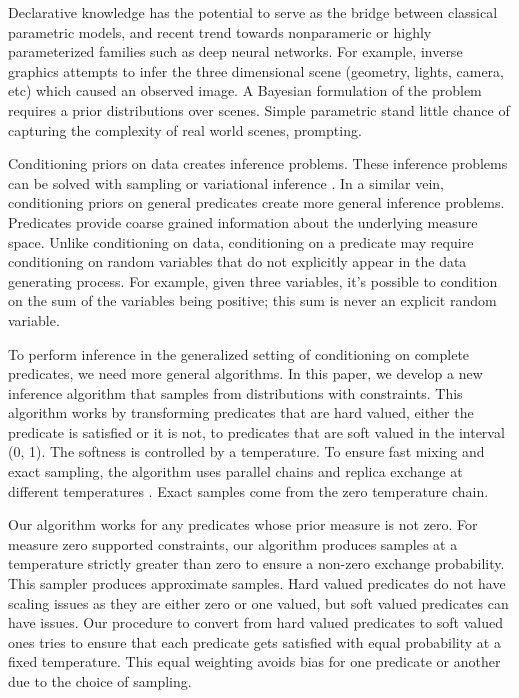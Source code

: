 Declarative knowledge has the potential to serve as the bridge between classical parametric models, and recent trend towards nonparameric or highly parameterized families such as deep neural networks.
For example, inverse graphics attempts to infer the three dimensional scene (geometry, lights, camera, etc) which caused an observed image.
A Bayesian formulation of the problem requires a prior distributions over scenes.
Simple parametric stand little chance of capturing the complexity of real world scenes, prompting.

Conditioning priors on data creates inference problems. These inference
problems can be solved with sampling \citep{andrieu2003introduction} or variational 
inference \citep{jordan1999introduction, ranganath2014black}.
In a similar vein, conditioning priors on general predicates create
more general inference problems. Predicates provide coarse grained
information about the underlying measure space. Unlike conditioning on
data, conditioning on a predicate may require conditioning on random
variables that do not explicitly appear in the data generating process.
For example, given three variables, it's possible to condition on the sum
of the variables being positive; this sum is never an explicit random variable.

To perform inference in the generalized setting of conditioning on 
complete predicates, we need more general algorithms. In this paper,
we develop a new inference algorithm that samples from distributions
with constraints. This algorithm works by transforming predicates
that are hard valued, either the predicate is satisfied
or it is not, to predicates that are soft valued in the interval
(0, 1). The softness is controlled by a temperature. To ensure fast
mixing and exact sampling, the algorithm uses parallel chains and 
replica exchange at different temperatures \citep{}. Exact samples come
from the zero temperature chain. 

Our algorithm works for any predicates whose prior measure is not
zero. For measure zero supported constraints, our algorithm
produces samples at a temperature strictly greater than
zero to ensure a non-zero exchange probability. This sampler
produces approximate samples. Hard valued predicates do not
have scaling issues as they are either zero or one valued,
but soft valued predicates can have issues. Our procedure
to convert from hard valued predicates to soft valued ones
tries to ensure that each predicate gets satisfied with equal
probability at a fixed temperature. This equal weighting 
avoids bias for one predicate or another due to the choice of sampling.

